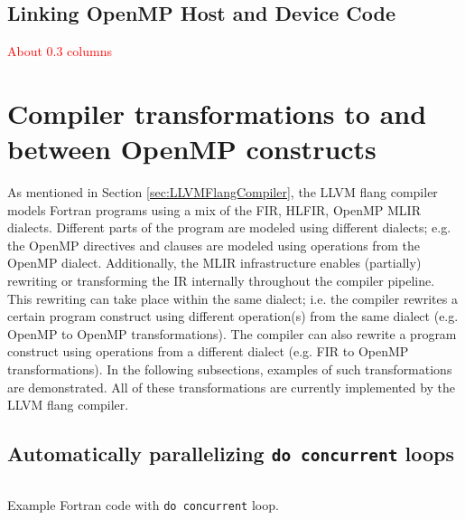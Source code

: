 \documentclass[acmtog,natbib=false]{acmart}
\newcommand{\todo}[1]{\textcolor{red}{#1}}
\newcommand{\code}[1]{\texttt{#1}\xspace}
\begin{document}

\subsection{Linking OpenMP Host and Device Code}
\label{sec:LinkingOpenMPHostandDeviceCode}

\todo{About 0.3 columns}


\section{Compiler transformations to and between OpenMP constructs}

As mentioned in Section \ref{sec:LLVMFlangCompiler}, the LLVM flang compiler models Fortran programs using a mix of the \ac{FIR}, \ac{HLFIR}, OpenMP \ac{MLIR} dialects.
Different parts of the program are modeled using different dialects; e.g. the OpenMP directives and clauses are modeled using operations from the OpenMP dialect.
Additionally, the \ac{MLIR} infrastructure enables (partially) rewriting or transforming the IR internally throughout the compiler pipeline.
This rewriting can take place within the same dialect; i.e. the compiler rewrites a certain program construct using different operation(s) from the same dialect (e.g. OpenMP to OpenMP transformations).
The compiler can also rewrite a program construct using operations from a different dialect (e.g. \ac{FIR} to OpenMP transformations).
In the following subsections, examples of such transformations are demonstrated.
All of these transformations are currently implemented by the LLVM flang compiler.

\subsection{Automatically parallelizing \code{do concurrent} loops}

\begin{listing}[t]
\inputminted{Fortran}{code/dc_saxpy.f90}
\caption{Example Fortran code with \code{do concurrent} loop.}
\label{lst:DCExample}
\end{listing}
\end{document}
